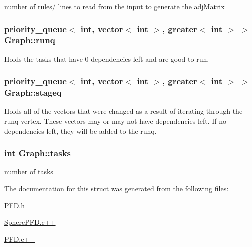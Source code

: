 number of rules/ lines to read from the input to generate the adj\-Matrix 

\hypertarget{structGraph_af6491f1c520f1cbff611984f0da0167a}{
\subsubsection[{runq}]{\setlength{\rightskip}{0pt plus 5cm}priority\-\_\-queue$<$ int, vector$<$ int $>$, greater$<$ int $>$ $>$ Graph\-::runq}}\label{structGraph_af6491f1c520f1cbff611984f0da0167a}


Holds the tasks that have 0 dependencies left and are good to run. 

\hypertarget{structGraph_a8e75929d511a2d1808f89b7a899c6f12}{
\subsubsection[{stageq}]{\setlength{\rightskip}{0pt plus 5cm}priority\-\_\-queue$<$ int, vector$<$ int $>$, greater$<$ int $>$ $>$ Graph\-::stageq}}\label{structGraph_a8e75929d511a2d1808f89b7a899c6f12}


Holds all of the vectors that were changed as a result of iterating through the runq vertex. These vectors may or may not have dependencies left. If no dependencies left, they will be added to the runq. 

\hypertarget{structGraph_a4d2a4b0944a121f0415137f0f1538e4a}{
\subsubsection[{tasks}]{\setlength{\rightskip}{0pt plus 5cm}int Graph\-::tasks}}\label{structGraph_a4d2a4b0944a121f0415137f0f1538e4a}


number of tasks 



The documentation for this struct was generated from the following files\-:\begin{DoxyCompactItemize}
\item 
\hyperlink{PFD_8h}{P\-F\-D.\-h}\item 
\hyperlink{SpherePFD_8c_09_09}{Sphere\-P\-F\-D.\-c++}\item 
\hyperlink{PFD_8c_09_09}{P\-F\-D.\-c++}\end{DoxyCompactItemize}
